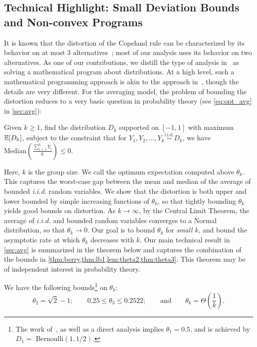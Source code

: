 \subsection{Technical Highlight: Small Deviation Bounds and Non-convex Programs} %
It is known that the distortion of the Copeland rule can be characterized by its behavior on at most $3$ alternatives~\cite{AnshelevichBEPS18}; most of our analysis uses its behavior on two alternatives. As one of our contributions, we distill the type of analysis in~\cite{AnshelevichBEPS18} as solving a mathematical program about distributions. At a high level, such a mathematical programming approach is akin to the approach in~\cite{CharikarR22}, though the details are very different. For the averaging model, the problem of bounding the distortion reduces to a very basic question in probability theory (see \cref{eq:opt_avg} in \cref{sec:avg}): 
\begin{question}
    Given $k \ge 1$, find the distribution $D_k$ supported on $[-1,1]$ with maximum $\mathbb{E}[D_k]$, subject to the constraint that for $Y_1, Y_2, \ldots, Y_k \overset{\text{i.i.d.}}{\sim} D_k$, we have $\mbox{Median}\left(\frac{\sum_{i=1}^k Y_i}{k}\right) \le 0$.  
\end{question} 

Here, $k$ is the group size. We call the optimum expectation computed above $\theta_k$. This captures the worst-case gap between the mean and median of the average of bounded {\em i.i.d.} random variables. We show that the distortion is both upper and lower bounded by simple increasing functions of $\theta_k$, so that tightly bounding $\theta_k$ yields good bounds on distortion. As $k \rightarrow \infty$, by the Central Limit Theorem, the average of $i.i.d.$ and bounded random variables converges to a Normal distribution, so that $\theta_k \rightarrow 0$. Our goal is to bound $\theta_k$ %
for {\em small} $k$, and bound the asymptotic rate at which $\theta_k$ decreases with $k$. Our main technical result in \cref{sec:avg} is summarized in the theorem below and captures the combination of the bounds in \cref{thm:berry,thm:lb1,lem:theta2,thm:theta3}. This theorem may be of independent interest in probability theory.

\begin{theorem} 
\label{thm:main}
We have the following bounds\footnote{The work of~\cite{AnshelevichBEPS18}, as well as a direct analysis implies $\theta_1 = 0.5$, and is achieved by $D_1 = $ Bernoulli$(1,1/2)$.} on $\theta_k$: 
$$\theta_2 = \sqrt{2} - 1; \qquad 0.25 \le \theta_3 \le 0.2522; \qquad \mbox{and}  \qquad  \theta_k = \Theta\left(\frac{1}{k}\right).$$ %
\end{theorem}

